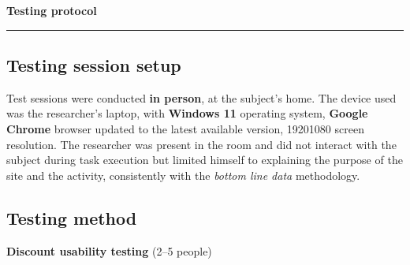 ﻿\documentclass[11pt,a4paper]{article}
\begin{document}
\vspace{0.2cm}

\begin{center}
  {\color{primaryColor}\large\bfseries Testing protocol}
  \vspace{0.1cm}
  \color{borderColor}\hrule
\end{center}

\vspace{0.2cm}

\subsection*{Testing session setup}
\begin{tcolorbox}[base]
Test sessions were conducted \textbf{in person},
at the subject's home. The device used was
the researcher's laptop, with \textbf{Windows 11}
operating system, \textbf{Google Chrome} browser updated
to the latest available version, 1920{\texttimes}1080 screen resolution.
The researcher was present in the room and did not interact
with the subject during task execution but limited himself to explaining the purpose of the site and the activity, consistently
with the \textit{bottom line data} methodology.
\end{tcolorbox}

\vspace{0.2cm}

\subsection*{Testing method}
\textbf{Discount usability testing} (2--5 people)

\vspace{0.2cm}
\end{document}
